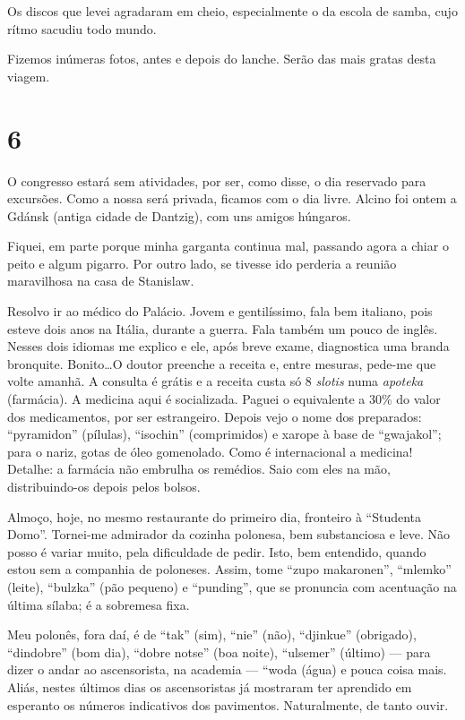 Os discos que levei agradaram em cheio, especialmente o da escola de samba, cujo rítmo sacudiu todo mundo.

Fizemos inúmeras fotos, antes e depois do lanche. Serão das mais gratas desta viagem.

\section*{6 \adfflatleafright {}}
O congresso estará sem atividades, por ser, como disse, o dia reservado para excursões. Como a nossa será privada, ficamos com o dia livre. Alcino foi ontem a Gdánsk (antiga cidade de Dantzig), com uns amigos húngaros.

Fiquei, em parte porque minha garganta continua mal, passando agora a chiar o peito e algum pigarro. Por outro lado, se tivesse ido perderia a reunião maravilhosa na casa de Stanislaw.

Resolvo ir ao médico do Palácio. Jovem e gentilíssimo, fala bem italiano, pois esteve dois anos na Itália, durante a guerra. Fala também um pouco de inglês. Nesses dois idiomas me explico e ele, após breve exame, diagnostica uma branda bronquite. Bonito\ldots O doutor preenche a receita e, entre mesuras, pede-me que volte amanhã. A consulta é grátis e a receita custa só 8 \textit{slotis} numa \textit{apoteka} (farmácia). A medicina aqui é socializada. Paguei o equivalente a 30\% do valor dos medicamentos, por ser estrangeiro. Depois vejo o nome dos preparados: ``pyramidon'' (pílulas), ``isochin'' (comprimidos) e xarope à base de ``gwajakol''; para o nariz, gotas de óleo gomenolado. Como é internacional a medicina! Detalhe: a farmácia não embrulha os remédios. Saio com eles na mão, distribuindo-os depois pelos bolsos.

Almoço, hoje, no mesmo restaurante do primeiro dia, fronteiro à ``Studenta Domo''. Tornei-me admirador da cozinha polonesa, bem substanciosa e leve. Não posso é variar muito, pela dificuldade de pedir. Isto, bem entendido, quando estou sem a companhia de poloneses. Assim, tome ``zupo makaronen'', ``mlemko'' (leite), ``bulzka'' (pão pequeno) e ``punding'', que se pronuncia com acentuação na última sílaba; é a sobremesa fixa.

Meu polonês, fora daí, é de ``tak'' (sim), ``nie'' (não), ``djinkue'' (obrigado), ``dindobre'' (bom dia), ``dobre notse'' (boa noite), ``ulsemer'' (último) --- para dizer o andar ao ascensorista, na academia --- ``woda (água) e pouca coisa mais. Aliás, nestes últimos dias os ascensoristas já mostraram ter aprendido em esperanto os números indicativos dos pavimentos. Naturalmente, de tanto ouvir.

